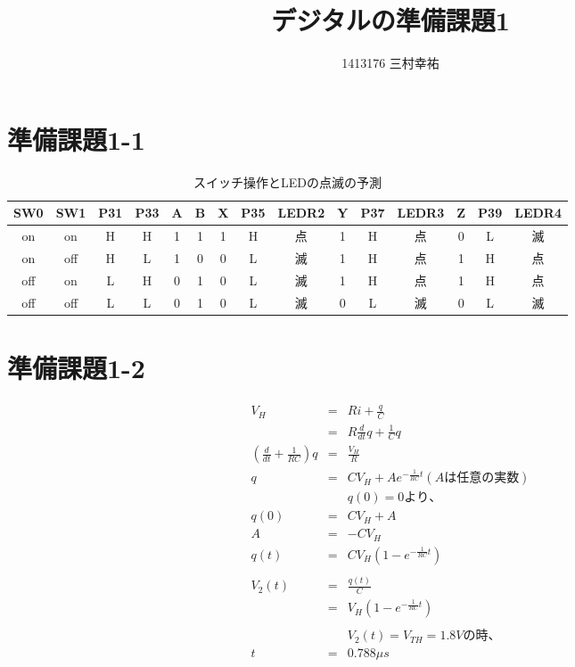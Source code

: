 \documentclass[11pt,a4j]{jsarticle}
\title{デジタルの準備課題1}
\author{1413176 三村幸祐}
\date{}
\begin{document}
 
 \section{準備課題1-1}
 
 
 \begin{table}[htb]
  \begin{center}
    \caption{スイッチ操作とLEDの点滅の予測}
    \begin{tabular}{ccccccccccccccc} \toprule
SW0 & SW1 & P31 & P33 & A & B & X & P35 & LEDR2 & Y & P37 & LEDR3 & Z & P39 & LEDR4 \\ \midrule
on & on & H & H & 1 & 1 & 1 & H & 点 & 1 & H & 点 & 0 & L & 滅 \\
on & off & H & L & 1 & 0 & 0 & L & 滅 & 1 & H & 点 & 1 & H & 点 \\
off & on & L & H & 0 & 1 & 0 & L & 滅 & 1 & H & 点 & 1 & H & 点 \\
off & off & L & L & 0 & 1 & 0 & L & 滅 & 0 & L & 滅 & 0 & L & 滅 \\ \bottomrule
    \end{tabular}
    \label{tab:price}
  \end{center}
\end{table}

 \section{準備課題1-2}
 
 \begin{eqnarray}
  V_H &=& R i + \frac{q}{C} \nonumber \\
      &=& R \frac{d}{dt} q + \frac{1}{C} q \nonumber \\
  (\frac{d}{dt} + \frac{1}{RC}) q &=& \frac{V_H}{R} \nonumber \\
  q &=& CV_H + A e^{-\frac{1}{RC}t} (Aは任意の実数) \nonumber \\
  && q(0) = 0 より、 \nonumber \\
  q(0) &=& CV_H + A \nonumber \\
  A &=& -CV_H \nonumber \\
  q(t) &=& CV_H (1-e^{-\frac{1}{RC}t}) \nonumber \\ \nonumber \\
  V_2(t) &=& \frac{q(t)}{C} \nonumber \\
         &=& V_H (1-e^{-\frac{1}{RC}t}) \nonumber \\ \nonumber \\
  && V_2(t)=V_{TH} = 1.8Vの時、 \nonumber \\
  t &=& 0.788 \mu s \nonumber
 \end{eqnarray}
\end{document}
